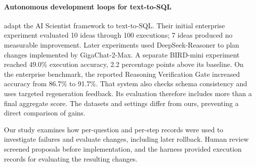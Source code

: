 \paragraph{Autonomous development loops for text-to-SQL}
\citet{ai-scientist-enterprise} adapt the AI Scientist framework to
text-to-SQL. Their initial enterprise experiment evaluated 10 ideas through
100 executions; 7 ideas produced no measurable improvement. Later experiments
used DeepSeek-Reasoner to plan changes implemented by GigaChat-2-Max. A separate
BIRD-mini experiment reached 49.0\% execution accuracy, 2.2 percentage points
above its baseline. On the enterprise benchmark, the reported Reasoning
Verification Gate increased accuracy from 86.7\% to 91.7\%. That system also
checks schema consistency and uses targeted regeneration feedback. Its
evaluation therefore includes more than a final aggregate score. The datasets
and settings differ from ours, preventing a direct comparison of gains.

Our study examines how per-question and per-step records were used to
investigate failures and evaluate changes, including later rollback.
Human review screened proposals before implementation, and the harness
provided execution records for evaluating the resulting changes.
